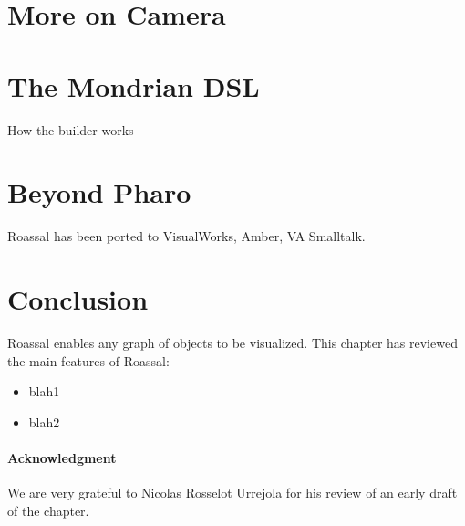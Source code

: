 \documentclass[a4paper,10pt,twoside]{book}
\begin{document}
\section{More on Camera}





\section{The Mondrian DSL}

How the builder works

\section{Beyond Pharo}

Roassal has been ported to VisualWorks, Amber, VA Smalltalk.



\section{Conclusion}

Roassal enables any graph of objects to be visualized. This chapter has reviewed the main features of Roassal:
\begin{itemize}
\item blah1
\item blah2
\end{itemize}

\paragraph{Acknowledgment}
We are very grateful to Nicolas Rosselot Urrejola for his review of an early draft of the chapter.

%
%


\ifx\wholebook\relax\else
   
   
\end{document}
